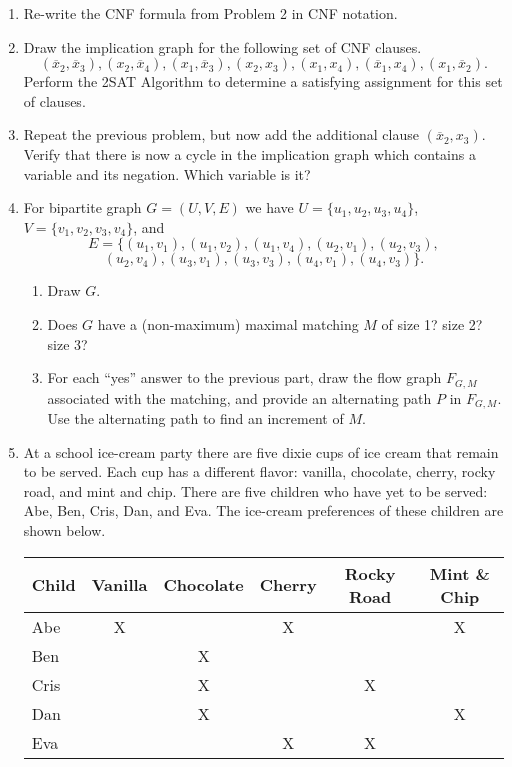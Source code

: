 \documentclass [12pt]{article}
\theoremstyle{definition}
\begin{document}
\begin{enumerate}
\item Re-write the CNF formula from Problem 2 in CNF notation.

\item Draw the implication graph for the following set of CNF clauses.
\[
(\overline{x}_{2},\overline{x}_{3}),
(x_{2},\overline{x}_{4}),
(x_{1},\overline{x}_{3}),
(x_{2},x_{3}),
(x_{1},x_{4}),
(\overline{x}_{1},x_{4}),
(x_{1},\overline{x}_{2}).\]
Perform the 2SAT Algorithm to determine a satisfying assignment for this set of clauses.

\item Repeat the previous problem, but now add the additional clause $(\overline{x}_{2},x_{3})$.
Verify that there is now a cycle in the implication graph which contains a variable and its negation.
Which variable is it?


\item For bipartite graph $G=(U,V,E)$ we have $U=\{u_{1},u_{2},u_{3},u_{4}\}$, $V=\{v_{1},v_{2},v_{3},v_{4}\}$, and 
\[E=\{(u_{1},v_{1}),(u_{1},v_{2}),(u_{1},v_{4}),(u_{2},v_{1}),(u_{2},v_{3}),\]
\[(u_{2},v_{4}),(u_{3},v_{1}),(u_{3},v_{3}),(u_{4},v_{1}),(u_{4},v_{3})\}.\]

\begin{enumerate}
\item Draw $G$.
\item Does $G$ have a (non-maximum) maximal matching $M$ of size 1? size 2? size 3? 
\item For each ``yes'' answer to the previous part, draw the flow graph $F_{G,M}$ associated with the 
matching, and provide an alternating path $P$ in  $F_{G,M}$. Use the alternating path to find an increment of $M$.
\end{enumerate}


\item At a school ice-cream party there are five dixie cups of ice cream that remain to be served. Each cup 
has a different flavor: vanilla, chocolate, cherry, rocky road, and mint and chip. There are five children
who have yet to be served: Abe, Ben, Cris, Dan, and Eva. The ice-cream preferences of these children are shown below.

\vspace{0.25in}
\begin{tabular}{|l|ccccc|}
\hline
\textbf{Child} & \textbf{Vanilla} & \textbf{Chocolate} & \textbf{Cherry} & \textbf{Rocky Road} & 
\textbf{Mint \& Chip}\\
\hline
Abe & X & & X & & X\\
Ben &  & X &  & & \\
Cris &  & X &  & X & \\
Dan &  & X &  & & X\\
Eva &  &  & X & X & \\
\hline
\end{tabular}


\end{enumerate}
\end{document}
